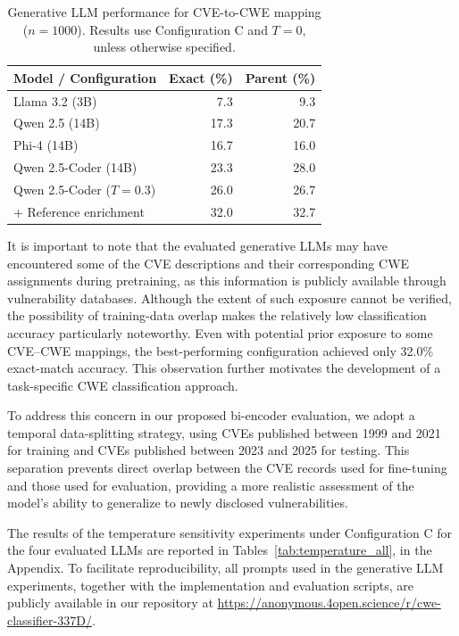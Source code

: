 \documentclass[conference,compsoc]{IEEEtran}
\begin{document}
\begin{table}[t]
\centering
\caption{Generative LLM performance for CVE-to-CWE
mapping ($n=1000$). Results use Configuration C
and $T=0$, unless otherwise specified.}
\label{tab:generative_llm_summary}
\scriptsize
\setlength{\tabcolsep}{3pt}
\begin{tabular}{lrr}
\toprule
\textbf{Model / Configuration}
& \textbf{Exact (\%)}
& \textbf{Parent (\%)} \\
\midrule
Llama 3.2 (3B)        & 7.3  & 9.3 \\
Qwen 2.5 (14B)        & 17.3 & 20.7 \\
Phi-4 (14B)          & 16.7 & 16.0 \\
Qwen 2.5-Coder (14B)  & 23.3 & 28.0 \\
\midrule
Qwen 2.5-Coder ($T=0.3$)
                       & 26.0 & 26.7 \\
+ Reference enrichment & 32.0 & 32.7 \\
\bottomrule
\end{tabular}
\end{table}


It is important to note that the evaluated generative
LLMs may have encountered some of the CVE descriptions
and their corresponding CWE assignments during
pretraining, as this information is publicly available
through vulnerability databases. Although the extent
of such exposure cannot be verified, the possibility
of training-data overlap makes the relatively low
classification accuracy particularly noteworthy.
Even with potential prior exposure to some CVE--CWE
mappings, the best-performing configuration achieved
only 32.0\% exact-match accuracy. This observation
further motivates the development of a task-specific
CWE classification approach.

To address this concern in our proposed bi-encoder
evaluation, we adopt a temporal data-splitting
strategy, using CVEs published between 1999 and
2021 for training and CVEs published between 2023
and 2025 for testing. This separation prevents
direct overlap between the CVE records used for
fine-tuning and those used for evaluation, providing
a more realistic assessment of the model's ability
to generalize to newly disclosed vulnerabilities.


The results of the temperature sensitivity experiments
under Configuration C for the four evaluated LLMs are
reported in Tables~\ref{tab:temperature_all}, in the Appendix.
To facilitate reproducibility, all prompts used in
the generative LLM experiments, together with the
implementation and evaluation scripts, are publicly
available in our repository at
\url{https://anonymous.4open.science/r/cwe-classifier-337D/}.
\end{document}
